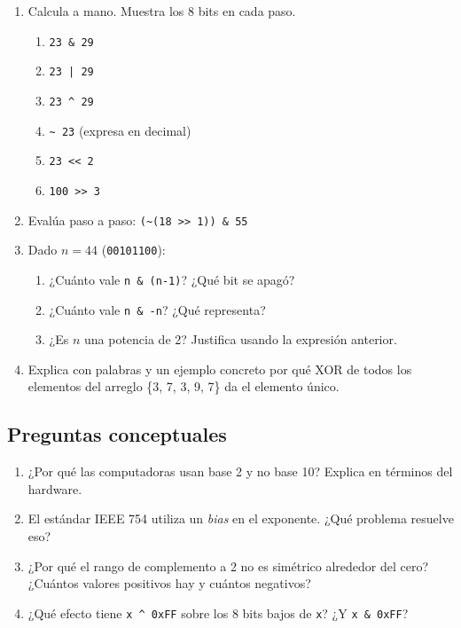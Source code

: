 \documentclass[12pt, oneside]{article}
\begin{document}
\begin{enumerate}[resume]
  \item Calcula a mano.  Muestra los 8 bits en cada paso.
        \begin{enumerate}
          \item \texttt{23 \& 29}
          \item \texttt{23 | 29}
          \item \texttt{23 \textasciicircum{} 29}
          \item \texttt{\textasciitilde{} 23} (expresa en decimal)
          \item \texttt{23 << 2}
          \item \texttt{100 >> 3}
        \end{enumerate}
  \item Evalúa paso a paso: \texttt{(\textasciitilde(18 >> 1)) \& 55}
  \item Dado $n = 44$ (\texttt{00101100}):
        \begin{enumerate}
          \item ¿Cuánto vale \texttt{n \& (n-1)}? ¿Qué bit se apagó?
          \item ¿Cuánto vale \texttt{n \& -n}? ¿Qué representa?
          \item ¿Es $n$ una potencia de 2? Justifica usando la expresión anterior.
        \end{enumerate}
  \item Explica con palabras y un ejemplo concreto por qué XOR de todos los
        elementos del arreglo \{3, 7, 3, 9, 7\} da el elemento único.
\end{enumerate}

\subsection{Preguntas conceptuales}

\begin{enumerate}[resume]
  \item ¿Por qué las computadoras usan base 2 y no base 10?
        Explica en términos del hardware.
  \item El estándar IEEE 754 utiliza un \textit{bias} en el exponente.
        ¿Qué problema resuelve eso?
  \item ¿Por qué el rango de complemento a 2 no es simétrico alrededor
        del cero? ¿Cuántos valores positivos hay y cuántos negativos?
  \item ¿Qué efecto tiene \texttt{x \textasciicircum{} 0xFF} sobre los
        8 bits bajos de \texttt{x}?  ¿Y \texttt{x \& 0xFF}?
\end{enumerate}
\end{document}
